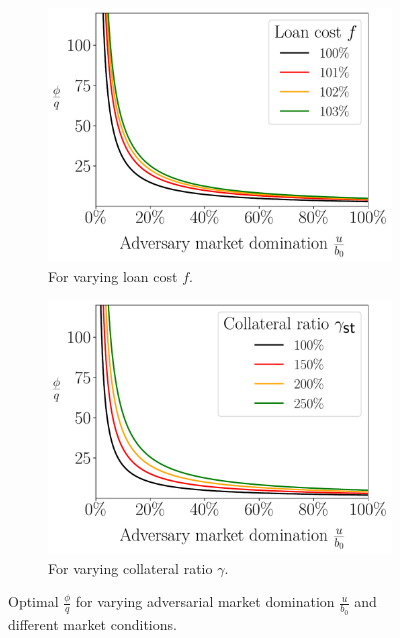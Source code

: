 \begin{figure}[htb]
  \centering
  \begin{subfigure}{0.4\textwidth}
    \includegraphics[width=\textwidth]{./figures/multiplef_plotu.pdf}
    \caption{For varying loan cost $f$.}
    \label{fig:compare-f-plotu}
  \end{subfigure}
  \hspace{10mm}
  \begin{subfigure}{0.4\textwidth}
    \includegraphics[width=\textwidth]{./figures/multiplegamma_plotu.pdf}
    \caption{For varying collateral ratio $\gamma$.}
    \label{fig:compare-f-plotu}
  \end{subfigure}
  \caption{Optimal $\frac{\phi}{q}$ for varying adversarial market domination
           $\frac{u}{b_0}$ and different market conditions.}
  \label{fig:plotu}
\end{figure}



